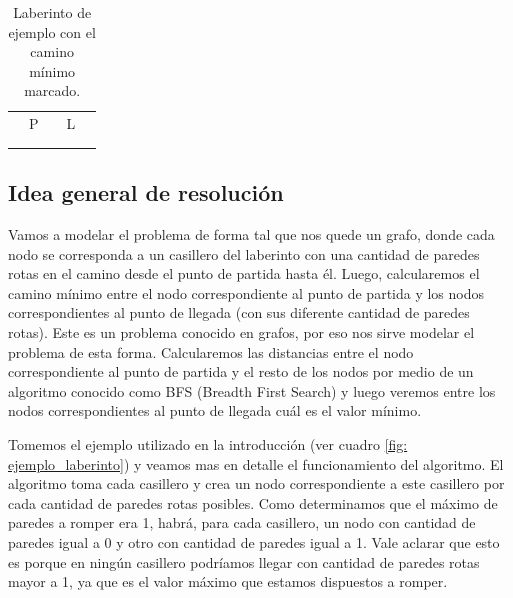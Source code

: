 \begin{table}[h]
	\centering
	\begin{tabular}{|>{\centering\arraybackslash}p{0.5cm}|>{\centering\arraybackslash}p{0.5cm}|>{\centering\arraybackslash}p{0.5cm}|>{\centering\arraybackslash}p{0.5cm}|>{\centering\arraybackslash}p{0.5cm}|}
		\hline
		\cellcolor{gray} & \cellcolor{gray} & \cellcolor{gray} & \cellcolor{gray} & \cellcolor{gray} \\ \hline
		\cellcolor{gray} & \cellcolor{green}P & \cellcolor{green} & \cellcolor{green}L & \cellcolor{gray} \\ \hline
		\cellcolor{gray} &  &  &  & \cellcolor{gray} \\ \hline
		\cellcolor{gray} & \cellcolor{gray} & \cellcolor{gray} & \cellcolor{gray} & \cellcolor{gray} \\
		\hline
	\end{tabular}
	\caption{Laberinto de ejemplo con el camino mínimo marcado.}
	\label{fig: ejemplo_laberinto_resuleto}
\end{table}

\subsection{Idea general de resolución}

\par Vamos a modelar el problema de forma tal que nos quede un grafo, donde cada nodo se corresponda a un casillero del laberinto con una cantidad de paredes rotas en el camino desde el punto de partida hasta él. Luego, calcularemos el camino mínimo entre el nodo correspondiente al punto de partida y los nodos correspondientes al punto de llegada (con sus diferente cantidad de paredes rotas). Este es un problema conocido en grafos, por eso nos sirve modelar el problema de esta forma. Calcularemos las distancias entre el nodo correspondiente al punto de partida y el resto de los nodos por medio de un algoritmo conocido como BFS (Breadth First Search) y luego veremos entre los nodos correspondientes al punto de llegada cuál es el valor mínimo.

\par Tomemos el ejemplo utilizado en la introducción (ver cuadro \ref{fig: ejemplo_laberinto}) y veamos mas en detalle el funcionamiento del algoritmo. El algoritmo toma cada casillero y crea un nodo correspondiente a este casillero por cada cantidad de paredes rotas posibles. Como determinamos que el máximo de paredes a romper era 1, habrá, para cada casillero, un nodo con cantidad de paredes igual a 0 y otro con cantidad de paredes igual a 1. Vale aclarar que esto es porque en ningún casillero podríamos llegar con cantidad de paredes rotas mayor a 1, ya que es el valor máximo que estamos dispuestos a romper.

